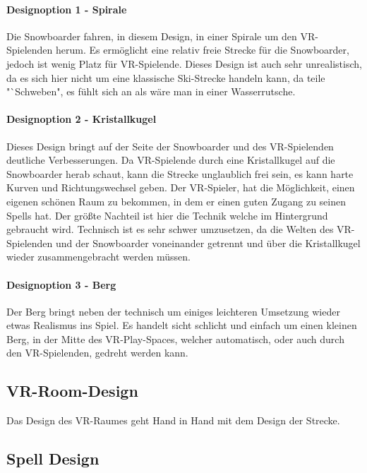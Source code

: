 \paragraph{Designoption 1 - Spirale}

Die Snowboarder fahren, in diesem Design, in einer Spirale um den VR-Spielenden herum. Es ermöglicht eine relativ freie Strecke für die Snowboarder, jedoch ist wenig Platz für VR-Spielende. Dieses Design ist auch sehr unrealistisch, da es sich hier nicht um eine klassische Ski-Strecke handeln kann, da teile "`Schweben", es fühlt sich an als wäre man in einer Wasserrutsche.

\paragraph{Designoption 2 - Kristallkugel}

Dieses Design bringt auf der Seite der Snowboarder und des VR-Spielenden deutliche Verbesserungen. Da VR-Spielende durch eine Kristallkugel auf die Snowboarder herab schaut, kann die Strecke unglaublich frei sein, es kann harte Kurven und Richtungswechsel geben. Der VR-Spieler, hat die Möglichkeit, einen eigenen schönen Raum zu bekommen, in dem er einen guten Zugang zu seinen Spells hat. Der größte Nachteil ist hier die Technik welche im Hintergrund gebraucht wird. Technisch ist es sehr schwer umzusetzen, da die Welten des VR-Spielenden und der Snowboarder voneinander getrennt und über die Kristallkugel wieder zusammengebracht werden müssen.

\paragraph{Designoption 3 - Berg}

Der Berg bringt neben der technisch um einiges leichteren Umsetzung wieder etwas Realismus ins Spiel. Es handelt sicht schlicht und einfach um einen kleinen Berg, in der Mitte des VR-Play-Spaces, welcher automatisch, oder auch durch den VR-Spielenden, gedreht werden kann.

\subsection{VR-Room-Design}

Das Design des VR-Raumes geht Hand in Hand mit dem Design der Strecke.

\subsection{Spell Design}

